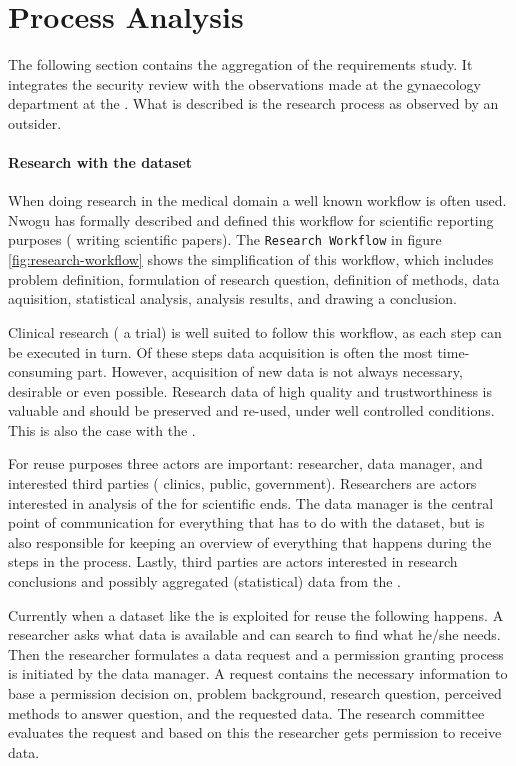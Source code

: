 \section{Process Analysis}
\label{process-analysis}

The following section contains the aggregation of the requirements study.
It integrates the security review with the observations made at the gynaecology department at the \AMC{}.
What is described is the research process as observed by an outsider.

\paragraph{Research with the \project{} dataset}

When doing research in the medical domain a well known workflow is often used. Nwogu \cite{nwogu} has formally described and defined this workflow for scientific reporting purposes (\ie{} writing scientific papers).
The {\tt Research Workflow} in figure \ref{fig:research-workflow} shows the simplification of this workflow, which includes problem definition, formulation of research question, definition of methods, data aquisition, statistical analysis, analysis results, and drawing a conclusion.

Clinical research (\eg{} a trial) is well suited to follow this workflow, as each step can be executed in turn.
Of these steps data acquisition is often the most time-consuming part.
However, acquisition of new data is not always necessary,  desirable or even possible. 
Research data of high quality and trustworthiness is valuable and should be preserved and re-used, under well controlled conditions. 
This is also the case with the \projectdata{}.

For reuse purposes three actors are important: researcher, data manager, and interested third parties (\eg{} clinics, public, government).
Researchers are actors interested in analysis of the \projectdata{} for scientific ends.
The data manager is the central point of communication for everything that has to do with the dataset, but is also responsible for keeping an overview of everything that happens during the steps in the process.
Lastly, third parties are actors interested in research conclusions and possibly aggregated (statistical) data from the \projectdata{}.

Currently when a dataset like the \projectdata{} is exploited for reuse the following happens.
A researcher asks what data is available and can search to find what he/she needs.
Then the researcher formulates a data request and a permission granting process is initiated by the data manager.
A request contains the necessary information to base a permission decision on, \eg{} problem background, research question, perceived methods to answer question, and the requested data.
The research committee evaluates the request and based on this the researcher gets permission to receive data.

